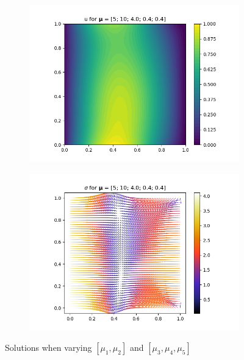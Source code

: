 \begin{figure}[!htb]
\begin{subfigure}{0.45\linewidth}
        \centering
        \includegraphics[width=\linewidth]{figs/mixed_u_mu345.png}
        \label{subfig:mu345_a}
    \end{subfigure}
    \begin{subfigure}{0.45\linewidth}
        \centering
        \includegraphics[width=\linewidth]{figs/mixed_sig_mu345.png}
        \label{subfig:mu345_b}
    \end{subfigure}
    
    \caption{Solutions when varying $[\mu_1, \mu_2]$ and $[\mu_3, \mu_4, \mu_5]$}
    \label{fig:solutions_compare_parametrisation}
\end{figure}

